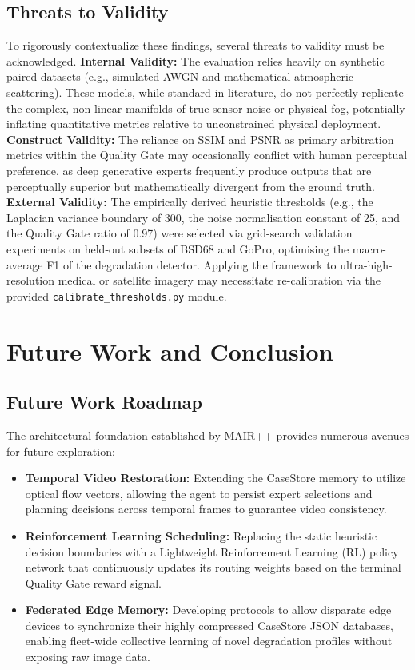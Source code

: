 \documentclass[journal, 10pt]{IEEEtran}
\begin{document}
\subsection{Threats to Validity}
To rigorously contextualize these findings, several threats to validity must be acknowledged. 
\textbf{Internal Validity:} The evaluation relies heavily on synthetic paired datasets (e.g., simulated AWGN and mathematical atmospheric scattering). These models, while standard in literature, do not perfectly replicate the complex, non-linear manifolds of true sensor noise or physical fog, potentially inflating quantitative metrics relative to unconstrained physical deployment.
\textbf{Construct Validity:} The reliance on SSIM and PSNR as primary arbitration metrics within the Quality Gate may occasionally conflict with human perceptual preference, as deep generative experts frequently produce outputs that are perceptually superior but mathematically divergent from the ground truth.
\textbf{External Validity:} The empirically derived heuristic thresholds (e.g., the Laplacian variance boundary of 300, the noise normalisation constant of 25, and the Quality Gate ratio of 0.97) were selected via grid-search validation experiments on held-out subsets of BSD68 and GoPro, optimising the macro-average F1 of the degradation detector. Applying the framework to ultra-high-resolution medical or satellite imagery may necessitate re-calibration via the provided \texttt{calibrate\_thresholds.py} module.


\section{Future Work and Conclusion}

\subsection{Future Work Roadmap}
The architectural foundation established by MAIR++ provides numerous avenues for future exploration:
\begin{itemize}
    \item \textbf{Temporal Video Restoration:} Extending the CaseStore memory to utilize optical flow vectors, allowing the agent to persist expert selections and planning decisions across temporal frames to guarantee video consistency.
    \item \textbf{Reinforcement Learning Scheduling:} Replacing the static heuristic decision boundaries with a Lightweight Reinforcement Learning (RL) policy network that continuously updates its routing weights based on the terminal Quality Gate reward signal.
    \item \textbf{Federated Edge Memory:} Developing protocols to allow disparate edge devices to synchronize their highly compressed CaseStore JSON databases, enabling fleet-wide collective learning of novel degradation profiles without exposing raw image data.
\end{itemize}
\end{document}

